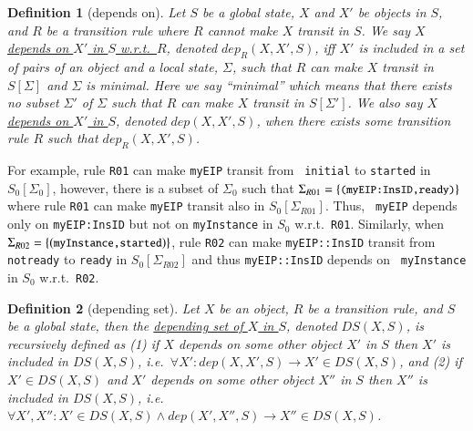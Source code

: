 \documentclass[12pt]{report}
\newtheorem{definition}{Definition}
\newcommand{\ra}{\rightarrow}
\newcommand{\mbstt}[1]{\mbox{\small{\tt {#1}}}}
\newcommand{\ul}{\underline}
\begin{document}
\begin{definition}[depends on]
Let $S$ be a global state, $X$ and $X'$ be objects in $S$, and $R$ be
a transition rule where $R$ cannot make $X$ transit in $S$.  We say
\ul{$X$ depends on $X'$ in $S$ w.r.t.\ $R$}, denoted \ul{$dep_R(X,
  X',S)$}, iff $X'$ is included in a set of pairs of an object and a
local state, $\Sigma$, such that $R$ can make $X$ transit in
$S[\Sigma]$ and $\Sigma$ is minimal.  Here we say ``minimal'' which
means that there exists no subset $\Sigma'$ of $\Sigma$ such that $R$
can make $X$ transit in $S[\Sigma']$. We also say \ul{$X$ depends on
  $X'$ in $S$}, denoted \ul{$dep(X, X',S)$}, when there exists some
transition rule $R$ such that $dep_R(X,X',S)$.
\end{definition}
For example, rule {\tt R01} can make {\tt myEIP} transit from {\tt
  initial} to {\tt started} in $S_0[\Sigma_0]$, however, there is a
subset of $\Sigma_0$ such that
$\Sigma_{R01}=\{\mbstt{(myEIP:InsID,ready)}\}$ where rule {\tt R01}
can make {\tt myEIP} transit also in $S_0[\Sigma_{R01}]$. Thus, {\tt
  myEIP} depends only on {\tt myEIP:InsID} but not on {\tt myInstance}
in $S_0$ w.r.t.\ {\tt R01}. Similarly, when
$\Sigma_{R02}=\{(\mbstt{myInstance,started})\}$, rule {\tt R02} can
make {\tt myEIP::InsID} transit from {\tt notready} to {\tt ready} in
$S_0[\Sigma_{R02}]$ and thus {\tt myEIP::InsID} depends on {\tt
  myInstance} in $S_0$ w.r.t.\ {\tt R02}.

\begin{definition}[depending set]
Let $X$ be an object, $R$ be a transition rule, and $S$ be a global
state, then the \ul{depending set of $X$ in $S$}, denoted
\ul{$DS(X,S)$}, is recursively defined as (1) if $X$ depends on some
other object $X'$ in $S$ then $X'$ is included in
$DS(X,S)$, i.e.\ $\forall X': dep(X,X',S) \ra X'\in DS(X,S)$, and
(2) if $X' \in DS(X,S)$ and $X'$ depends on some other object $X''$
in $S$ then $X''$ is included in $DS(X,S)$, i.e.\ $\forall
X',X'':X'\in DS(X,S) \land dep(X',X'',S) \ra X''\in DS(X,S)$.
\end{definition}
\end{document}

